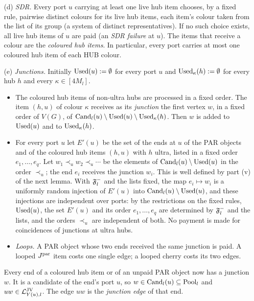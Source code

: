 \begin{construction}
\smallskip\noindent
(d) \emph{SDR.} Every port $u$ carrying at least one live hub item chooses, by a
fixed rule, pairwise distinct colours for its live hub items, each item's colour
taken from the list of its group (a system of distinct representatives). If no
such choice exists, all live hub items of $u$ are paid (an \emph{SDR failure} at
$u$). The items that receive a colour are the \emph{coloured hub items}. In
particular, every port carries at most one coloured hub item of each HUB colour.

\smallskip\noindent
(e) \emph{Junctions.} Initially $\mathrm{Used}(u)\mathrel{:=}\emptyset$ for every port $u$ and
$\mathrm{Used}_\kappa(h)\mathrel{:=}\emptyset$ for every hub $h$ and every $\kappa\in[4M_l]$.
\begin{itemize}
\item[(e1)] The coloured hub items of non-ultra hubs are processed in a fixed
order. The item $(h,u)$ of colour $\kappa$ receives as its \emph{junction} the
first vertex $w$, in a fixed order of $V(G)$, of
$\mathrm{Cand}_l(u)\setminus\mathrm{Used}(u)\setminus\mathrm{Used}_\kappa(h)$. Then $w$ is added to
$\mathrm{Used}(u)$ and to $\mathrm{Used}_\kappa(h)$.
\item[(e2)] For every port $u$ let $E'(u)$ be the set of the ends at $u$ of the
PAR objects and of the coloured hub items $(h,u)$ with $h$ ultra, listed in a
fixed order $e_1,\dots,e_q$. Let $w_1\prec_u w_2\prec_u\cdots$ be the elements of
$\mathrm{Cand}_l(u)\setminus\mathrm{Used}(u)$ in the order $\prec_u$; the end $e_i$ receives the
junction $w_i$. This is well defined by part (v) of the next lemma. With
$\mathfrak{F}^{-}_l$ and the lists fixed, the map $e_i\mapsto w_i$ is a uniformly random
injection of $E'(u)$ into $\mathrm{Cand}_l(u)\setminus\mathrm{Used}(u)$, and these injections are
independent over ports: by the restrictions on the fixed rules, $\mathrm{Used}(u)$, the
set $E'(u)$ and its order $e_1,\dots,e_q$ are determined by $\mathfrak{F}^{-}_l$ and the
lists, and the orders $\prec_u$ are independent of both. No payment is made for
coincidences of junctions at ultra hubs.
\item[(e3)] \emph{Loops.} A PAR object whose two ends received the same junction
is paid. A looped $J^{\mathrm{par}}$ item costs one single edge; a looped cherry costs its
two edges.
\end{itemize}
Every end of a coloured hub item or of an unpaid PAR object now has a junction
$w$. It is a candidate of the end's port $u$, so $w\in\mathrm{Cand}_l(u)\subseteq\mathrm{Pool}_l$
and $uw\in\mathcal{L}^{\mathrm{JV}}_{Y(u),l}$. The edge $uw$ is the \emph{junction edge} of that end.


\end{construction}
